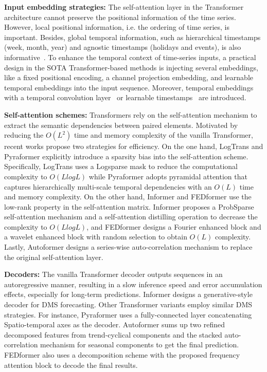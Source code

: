 \documentclass[10pt,twocolumn,letterpaper]{article}
\begin{document}
\noindent\textbf{Input embedding strategies:}
The self-attention layer in the Transformer architecture cannot preserve the positional information of the time series. However, local positional information, i.e. the ordering of time series, is important. Besides, global temporal information, such as hierarchical timestamps (week, month, year) and agnostic timestamps (holidays and events), is also informative~\cite{informer}.
To enhance the temporal context of time-series inputs, a practical design in the SOTA Transformer-based methods is injecting several embeddings, like a fixed positional encoding, a channel projection embedding, and learnable temporal embeddings into the input sequence. Moreover, temporal embeddings with a temporal convolution layer~\cite{li2019LogTrans} or learnable timestamps~\cite{xu2021autoformer} are introduced. 


\noindent\textbf{Self-attention schemes:}
Transformers rely on the self-attention mechanism to extract the semantic dependencies between paired elements.
Motivated by reducing the $O\left(L^{2}\right)$ time and memory complexity of the vanilla Transformer, recent works propose two strategies for efficiency. On the one hand, LogTrans and Pyraformer explicitly introduce a sparsity bias into the self-attention scheme. Specifically, LogTrans uses a Logsparse mask to reduce the computational complexity to $O\left(LlogL\right)$ while Pyraformer adopts pyramidal attention that captures hierarchically multi-scale temporal dependencies with an $O\left(L\right)$ time and memory complexity. On the other hand, Informer and FEDformer use the low-rank property in the self-attention matrix. Informer proposes a ProbSparse self-attention mechanism and a self-attention distilling operation to decrease the complexity to $O\left(LlogL\right)$, and FEDformer designs a Fourier enhanced block and a wavelet enhanced block with random 
selection to obtain $O\left(L\right)$ complexity. Lastly, Autoformer designs a series-wise auto-correlation mechanism to replace the original self-attention layer.


\noindent\textbf{Decoders:}
The vanilla Transformer decoder outputs sequences in an autoregressive manner, resulting in a slow inference speed and error accumulation effects, especially for long-term predictions.
Informer designs a generative-style decoder for DMS forecasting. Other Transformer variants employ similar DMS strategies. 
For instance, Pyraformer uses a fully-connected layer concatenating Spatio-temporal axes as the decoder.
Autoformer sums up two refined decomposed features from trend-cyclical components and the stacked auto-correlation mechanism for seasonal components to get the final prediction. FEDformer also uses a decomposition scheme with the proposed frequency attention block to decode the final results.
\end{document}
